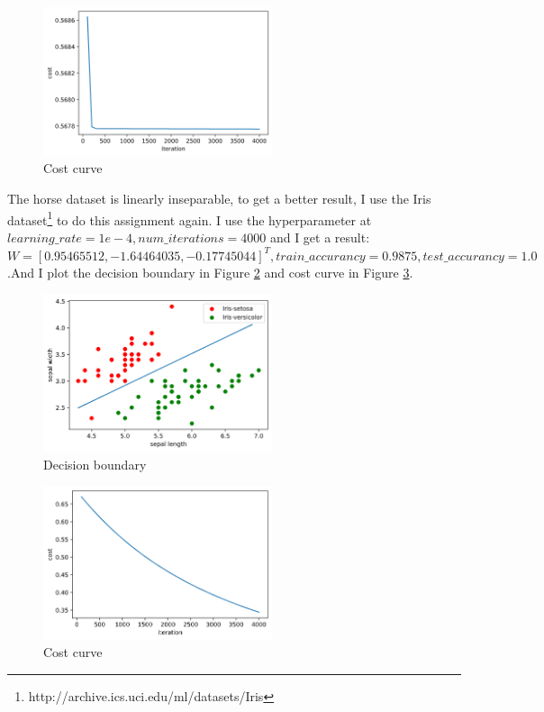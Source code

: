 \documentclass[11pt,a4paper]{article}
\begin{document}
    \begin{figure}[H]
        \centering
        \includegraphics[width=0.6\textwidth]{Figure_3.png} %
        \caption{Cost curve}
        \label{Fig.main3}
    \end{figure}

    The horse dataset is linearly inseparable, to get a better result, I use the Iris dataset\footnote{http://archive.ics.uci.edu/ml/datasets/Iris} to do this assignment 
    again. I use the hyperparameter at $learning\_rate = 1e-4, num\_iterations = 4000$ and I get a
    result: $W = [ 0.95465512 ,-1.64464035, -0.17745044]^T, train\_accurancy = 0.9875,
    test\_accurancy = 1.0$.And I plot the decision boundary in Figure \ref{Fig.main4} and cost curve in Figure \ref{Fig.main5}.

    \begin{figure}[H]
        \centering
        \includegraphics[width=0.6\textwidth]{Figure4.png} %
        \caption{Decision boundary}
        \label{Fig.main4}
    \end{figure}

    \begin{figure}[H]
        \centering
        \includegraphics[width=0.6\textwidth]{Figure5.png} %
        \caption{Cost curve}
        \label{Fig.main5}
    \end{figure}
\end{document}
